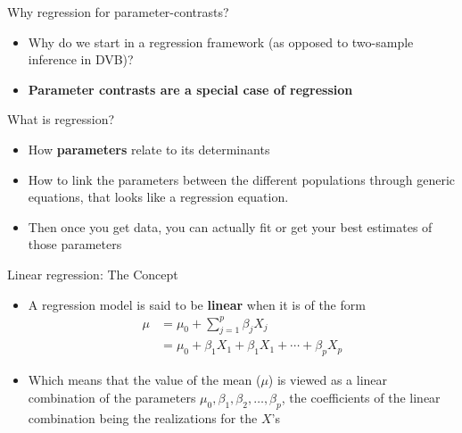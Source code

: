 \documentclass[10pt]{beamer}\usepackage[]{graphicx}\usepackage[]{color}
\begin{document}
\begin{frame}{Why regression for parameter-contrasts?}
	
	\begin{itemize}
		\setlength\itemsep{1.5em}
		\item Why do we start in a regression framework (as opposed to two-sample inference in DVB)?  
		\item \textbf{Parameter contrasts are a special case of regression}  
	\end{itemize}
	
\end{frame}


\begin{frame}{What is regression?}
	
	\begin{itemize}
		\setlength\itemsep{2em}
		\item How \textbf{parameters} relate to its determinants 
		\item How to link the parameters between the different populations through generic equations, that looks like a regression equation.  
		\item Then once you get data, you can actually fit or get your best estimates of those parameters
	\end{itemize}
	
\end{frame}

\begin{frame}{Linear regression: The Concept}
	
	\begin{itemize}
		\setlength\itemsep{2em}
		\item A regression model is said to be \textbf{linear} when it is of the form 
		\begin{align*}
			\mu & = \mu_0 + \sum_{j=1}^p \beta_j X_j \\
			& = \mu_0 + \beta_1 X_1 +  \beta_1 X_1 + \cdots +  \beta_p X_p
		\end{align*}
		
		\item Which means that the value of the mean ($\mu$) is viewed as a linear combination of the parameters $\mu_0, \beta_1, \beta_2, \ldots, \beta_p$, the coefficients of the linear combination being the realizations for the $X$'s
		
	\end{itemize}
	
\end{frame}
\end{document}
